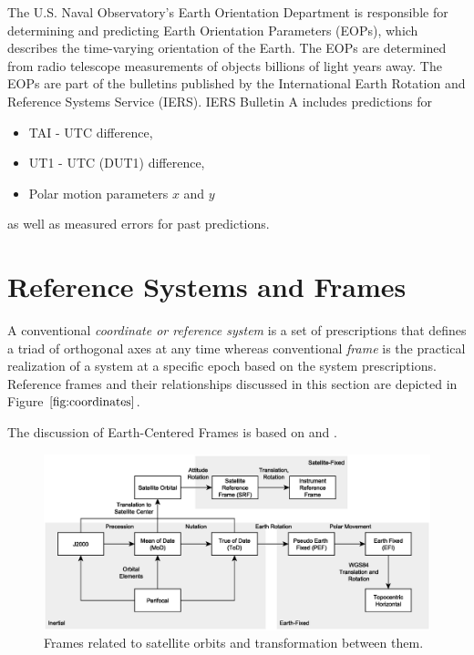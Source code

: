 \documentclass [12pt, a4paper] {article}
\begin{document}
The U.S. Naval Observatory's Earth Orientation Department is responsible for
determining and predicting Earth Orientation Parameters (EOPs), which describes
the time-varying orientation of the Earth. The EOPs are determined from radio 
telescope measurements of objects billions of light years away. The EOPs are 
part of the bulletins published by the International Earth Rotation and Reference
Systems Service (IERS). IERS Bulletin A includes predictions for 
\begin {itemize}
  \item TAI - UTC difference,
  \item UT1 - UTC (DUT1) difference,
  \item Polar motion parameters $x$ and $y$
\end {itemize}
as well as measured errors for past predictions.



\section{Reference Systems and Frames}
A conventional \emph{coordinate or reference system} is a set of prescriptions that defines 
a triad of orthogonal axes at any time whereas conventional \emph{frame} is the practical 
realization of a system at a specific epoch based on the system prescriptions. Reference 
frames and their relationships discussed in this section are depicted in 
Figure $\ref{fig:coordinates}$.

The discussion of Earth-Centered Frames is based on \cite{gnss} and \cite{aiaa_frames}.
\begin {figure}
  \begin {center}
     \includegraphics [angle=0, width=1.0\columnwidth] {figures/coordinates.eps}
     \caption{\label{fig:coordinates} Frames related to satellite orbits and transformation between 
     them.}
  \end {center}
\end {figure} 
\end{document}
